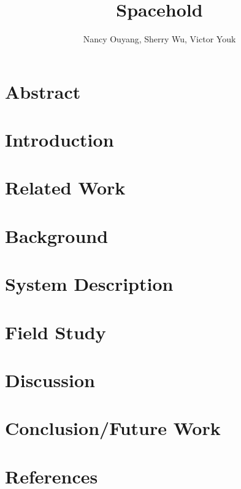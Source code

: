 \documentclass[11pt,twocolumn]{article}
\title{Spacehold}
\author{Nancy Ouyang, Sherry Wu, Victor Youk}
\begin{document}
\maketitle

\section{Abstract}

\section{Introduction}

\section{Related Work}

\section{Background}

\section{System Description}

\section{Field Study}

\section{Discussion}

\section{Conclusion/Future Work}

\section{References}
\end{document}
